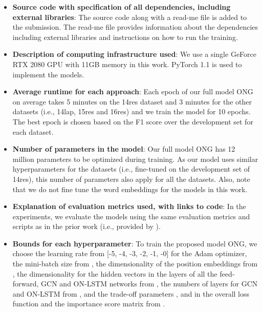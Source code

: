 \documentclass[11pt,a4paper]{article}
\begin{document}
\begin{itemize}






\item \textbf{Source code with specification of all dependencies, including external libraries}: The source code along with a read-me file is added to the submission. The read-me file provides information about the dependencies including external libraries and instructions on how to run the training. 



\item \textbf{Description of computing infrastructure
used}: We use a single GeForce RTX 2080 GPU with 11GB memory in this work. PyTorch 1.1 is used to implement the models.


\item \textbf{Average runtime for each approach}: Each epoch of our full model ONG on average takes 5 minutes on the 14res dataset and 3 minutes for the other datasets (i.e., 14lap, 15res and 16res) and we train the model for 10 epochs. The best epoch is chosen based on the F1 score over the development set for each dataset.


\item \textbf{Number of parameters in the model}: Our full model ONG has 12 million parameters to be optimized during training. As our model uses similar hyperparameters for the datasets (i.e., fine-tuned on the development set of 14res), this number of parameters also apply for all the datasets. Also, note that we do not fine tune the word embeddings for the models in this work.

\item \textbf{Explanation of evaluation metrics used,
with links to code}: In the experiments, we evaluate the models using the same evaluation metrics and scripts as in the prior work (i.e., provided by \citep{fan2019target}).







\item \textbf{Bounds for each hyperparameter}: To train the proposed model ONG, we choose the learning rate from [-5, -4, -3, -2, -1, -0] for the Adam optimizer, the mini-batch size from , the dimensionality of the position embeddings from  , the dimensionality for the hidden vectors in the layers of all the feed-forward, GCN and ON-LSTM networks from , the numbers of layers for GCN and ON-LSTM from , and the trade-off parameters ,  and  in the overall loss function and the importance score matrix  from .




\end{itemize}
\end{document}

